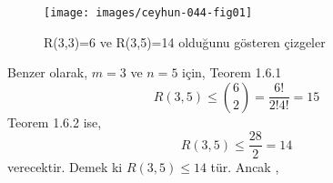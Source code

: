 \documentclass[11pt]{amsbook}
\begin{document}
\begin{figure}[htb]
	\centering
	\texttt{[image: images/ceyhun-044-fig01]}
	\caption{R(3,3)=6 ve R(3,5)=14 olduğunu gösteren çizgeler}
\end{figure}
\par Benzer olarak, $m=3$ ve $n=5$ için, Teorem 1.6.1
$$ R(3,5) \leq \binom{6}{2} = \frac{6!}{2!4!} = 15$$ 
Teorem 1.6.2 ise,
$$R(3,5) \leq \frac{28}{2} = 14$$
verecektir. Demek ki $R(3,5) \leq 14$ tür. Ancak ,
\end{document}
